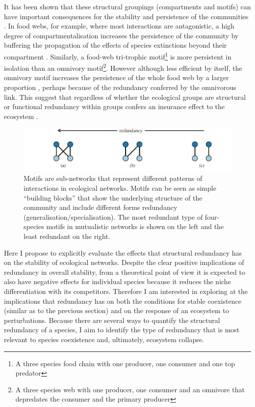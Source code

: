 \documentclass[a4paper]{article}
\begin{document}
It has been shown that these structural groupings (compartments and motifs) can have important consequences for the stability and persistence of the communities \autocite{Neutel2002, Kondoh2008, Thebault2010, Stouffer2010, Stouffer2011}.
In food webs, for example, where most interactions are antagonistic, a high degree of compartmentalisation increases the persistence of the community by buffering the propagation of the effects of species extinctions beyond their compartment \autocite{Stouffer2011}.
Similarly, a food-web tri-trophic motif\footnote{A three species food chain with one producer, one consumer and one top predator} is more persistent in isolation than an omnivory motif\footnote{A three species web with one producer, one consumer and an omnivore that depredates the consumer and the primary producer}.
However although less efficient by itself, the omnivory motif increases the persistence of the whole food web by a larger proportion \autocite{Stouffer2010}, perhaps because of the redundancy conferred by the omnivorous link.
This suggest that regardless of whether the ecological groups are structural or functional redundancy within groups confers an insurance effect to the ecosystem \autocite{Walker1992}.

\begin{figure}[tbp]
  \centering
  \includegraphics{motifs}
  \caption{
  \label{fig:motifs}
  Motifs are sub-networks that represent different patterns of interactions in ecological networks.
  Motifs can be seen as simple “building blocks” that show the underlying structure of the community and include different forms redundancy (generalisation/specialisation).
  The most redundant type of four-species motifs in mutualistic networks is shown on the left and the least redundant on the right.
  }
\end{figure}

Here I propose to explicitly evaluate the effects that structural redundancy has on the stability of ecological networks.
Despite the clear positive implications of redundancy in overall stability, from a theoretical point of view it is expected to also have negative effects for individual species because it reduces the niche differentiation with its competitors.
Therefore I am interested in exploring at the implications that redundancy has on both the conditions for stable coexistence (similar as to the previous section) and on the response of an ecosystem to perturbations.
Because there are several ways to quantify the structural redundancy of a species, I aim to identify the type of redundancy that is most relevant to species coexistence and, ultimately, ecosystem collapse.
\end{document}
